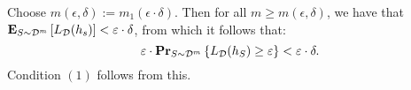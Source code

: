 Choose $m(\epsilon, \delta) := m_1(\epsilon \cdot \delta)$. Then for all $m
\geq m(\epsilon, \delta)$, we have that $\mathbf{E}_{S \sim
\mathcal{D}^m} \left [ L_{\mathcal{D}}(h_s) \right ] < \varepsilon \cdot \delta$, from which it follows that:
\[
    \varepsilon \cdot  \mathbf{Pr}_{S \sim \mathcal{D}^{m}} \left \{ L_{\mathcal{D}} (h_S) \geq \varepsilon \right \} <
        \varepsilon \cdot \delta. \]
Condition $(1)$ follows from this.
